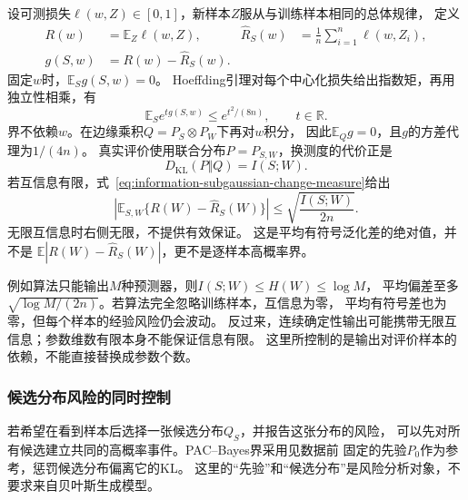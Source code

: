 设可测损失\(\ell(w,Z)\in[0,1]\)，新样本\(Z\)服从与训练样本相同的总体规律，
定义
\[
  \begin{aligned}
    R(w)&=\mathbb E_Z\ell(w,Z),&
    \widehat R_S(w)&=\frac1n\sum_{i=1}^n\ell(w,Z_i),\\
    g(S,w)&=R(w)-\widehat R_S(w).
  \end{aligned}
\]
固定\(w\)时，\(\mathbb E_Sg(S,w)=0\)。
Hoeffding引理对每个中心化损失给出指数矩，再用独立性相乘，有
\[
  \mathbb E_Se^{t g(S,w)}\leq e^{t^2/(8n)},\qquad t\in\mathbb R.
\]
界不依赖\(w\)。在边缘乘积\(Q=P_S\otimes P_W\)下再对\(w\)积分，
因此\(\mathbb E_Qg=0\)，且\(g\)的方差代理为\(1/(4n)\)。
真实评价使用联合分布\(P=P_{S,W}\)，换测度的代价正是
\[
  D_{\mathrm{KL}}(P\Vert Q)=I(S;W).
\]
若互信息有限，式~\eqref{eq:information-subgaussian-change-measure}给出
\begin{equation}
  \left|\mathbb E_{S,W}\{R(W)-\widehat R_S(W)\}\right|
  \leq\sqrt{\frac{I(S;W)}{2n}}.
  \label{eq:information-mi-generalization}
\end{equation}
无限互信息时右侧无限，不提供有效保证。
这是平均有符号泛化差的绝对值，并不是
\(\mathbb E|R(W)-\widehat R_S(W)|\)，更不是逐样本高概率界。

例如算法只能输出\(M\)种预测器，则\(I(S;W)\leq H(W)\leq\log M\)，
平均偏差至多\(\sqrt{\log M/(2n)}\)。若算法完全忽略训练样本，互信息为零，
平均有符号差也为零，但每个样本的经验风险仍会波动。
反过来，连续确定性输出可能携带无限互信息；参数维数有限本身不能保证信息有限。
这里所控制的是输出对评价样本的依赖，不能直接替换成参数个数。

\subsubsection{候选分布风险的同时控制}
\label{sec:information-pac-bayes}

若希望在看到样本后选择一张候选分布\(Q_S\)，并报告这张分布的风险，
可以先对所有候选建立共同的高概率事件。PAC--Bayes界采用见数据前
固定的先验\(P_0\)作为参考，惩罚候选分布偏离它的KL。
这里的“先验”和“候选分布”是风险分析对象，不要求来自贝叶斯生成模型。

